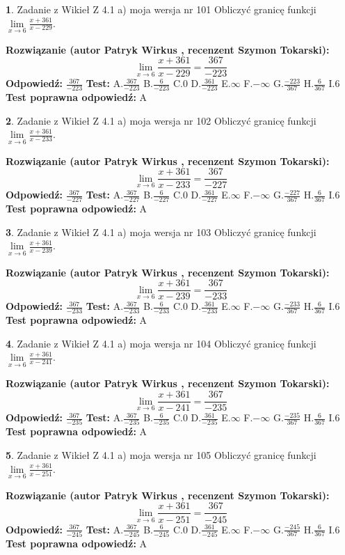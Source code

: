 \documentclass[12pt, a4paper]{article}
\theoremstyle{definition} %
\newtheorem{zad}{}
\newcommand{\zadStart}[1]{\begin{zad}#1\newline}
\newcommand{\zadStop}{\end{zad}}
\newcommand{\rozwStart}[2]{\noindent \textbf{Rozwiązanie (autor #1 , recenzent #2): }\newline}
\newcommand{\rozwStop}{\newline}
\newcommand{\odpStart}{\noindent \textbf{Odpowiedź:}\newline}
\newcommand{\odpStop}{\newline}
\newcommand{\testStart}{\noindent \textbf{Test:}\newline}
\newcommand{\testStop}{\newline}
\newcommand{\kluczStart}{\noindent \textbf{Test poprawna odpowiedź:}\newline}
\newcommand{\kluczStop}{\newline}
\begin{document}
\zadStart{Zadanie z Wikieł Z 4.1 a) moja wersja nr 101}
Obliczyć granicę funkcji $\lim\limits_{x\to6}\frac{x+361}{x-229}$.
\zadStop
\rozwStart{Patryk Wirkus}{Szymon Tokarski}
$$\lim\limits_{x\to6}\frac{x+361}{x-229} = \frac{367}{-223}$$
\rozwStop
\odpStart
$\frac{367}{-223}$
\odpStop
\testStart
A.$\frac{367}{-223}$
B.$\frac{6}{-223}$
C.$0$
D.$\frac{361}{-223}$
E.$\infty$
F.$-\infty$
G.$\frac{-223}{367}$
H.$\frac{6}{367}$
I.$6$
\testStop
\kluczStart
A
\kluczStop



\zadStart{Zadanie z Wikieł Z 4.1 a) moja wersja nr 102}
Obliczyć granicę funkcji $\lim\limits_{x\to6}\frac{x+361}{x-233}$.
\zadStop
\rozwStart{Patryk Wirkus}{Szymon Tokarski}
$$\lim\limits_{x\to6}\frac{x+361}{x-233} = \frac{367}{-227}$$
\rozwStop
\odpStart
$\frac{367}{-227}$
\odpStop
\testStart
A.$\frac{367}{-227}$
B.$\frac{6}{-227}$
C.$0$
D.$\frac{361}{-227}$
E.$\infty$
F.$-\infty$
G.$\frac{-227}{367}$
H.$\frac{6}{367}$
I.$6$
\testStop
\kluczStart
A
\kluczStop



\zadStart{Zadanie z Wikieł Z 4.1 a) moja wersja nr 103}
Obliczyć granicę funkcji $\lim\limits_{x\to6}\frac{x+361}{x-239}$.
\zadStop
\rozwStart{Patryk Wirkus}{Szymon Tokarski}
$$\lim\limits_{x\to6}\frac{x+361}{x-239} = \frac{367}{-233}$$
\rozwStop
\odpStart
$\frac{367}{-233}$
\odpStop
\testStart
A.$\frac{367}{-233}$
B.$\frac{6}{-233}$
C.$0$
D.$\frac{361}{-233}$
E.$\infty$
F.$-\infty$
G.$\frac{-233}{367}$
H.$\frac{6}{367}$
I.$6$
\testStop
\kluczStart
A
\kluczStop



\zadStart{Zadanie z Wikieł Z 4.1 a) moja wersja nr 104}
Obliczyć granicę funkcji $\lim\limits_{x\to6}\frac{x+361}{x-241}$.
\zadStop
\rozwStart{Patryk Wirkus}{Szymon Tokarski}
$$\lim\limits_{x\to6}\frac{x+361}{x-241} = \frac{367}{-235}$$
\rozwStop
\odpStart
$\frac{367}{-235}$
\odpStop
\testStart
A.$\frac{367}{-235}$
B.$\frac{6}{-235}$
C.$0$
D.$\frac{361}{-235}$
E.$\infty$
F.$-\infty$
G.$\frac{-235}{367}$
H.$\frac{6}{367}$
I.$6$
\testStop
\kluczStart
A
\kluczStop



\zadStart{Zadanie z Wikieł Z 4.1 a) moja wersja nr 105}
Obliczyć granicę funkcji $\lim\limits_{x\to6}\frac{x+361}{x-251}$.
\zadStop
\rozwStart{Patryk Wirkus}{Szymon Tokarski}
$$\lim\limits_{x\to6}\frac{x+361}{x-251} = \frac{367}{-245}$$
\rozwStop
\odpStart
$\frac{367}{-245}$
\odpStop
\testStart
A.$\frac{367}{-245}$
B.$\frac{6}{-245}$
C.$0$
D.$\frac{361}{-245}$
E.$\infty$
F.$-\infty$
G.$\frac{-245}{367}$
H.$\frac{6}{367}$
I.$6$
\testStop
\kluczStart
A
\kluczStop
\end{document}
